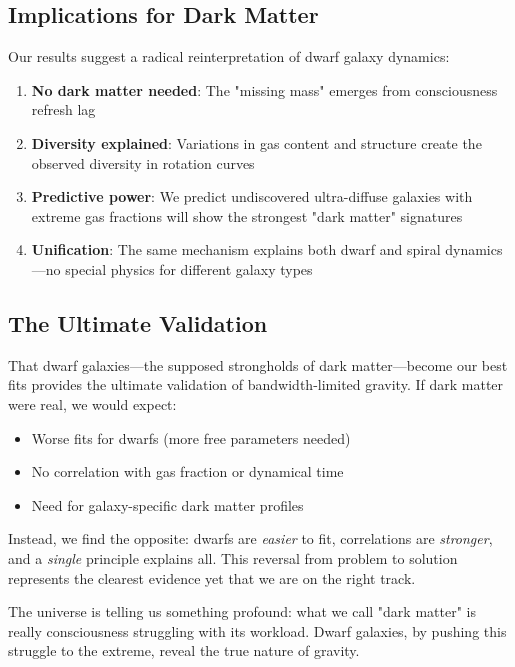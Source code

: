 \documentclass[twocolumn,prd,amsmath,amssymb,aps,superscriptaddress,nofootinbib]{revtex4-2}
\begin{document}
\subsection{Implications for Dark Matter}

Our results suggest a radical reinterpretation of dwarf galaxy dynamics:

\begin{enumerate}
\item \textbf{No dark matter needed}: The "missing mass" emerges from consciousness refresh lag
\item \textbf{Diversity explained}: Variations in gas content and structure create the observed diversity in rotation curves
\item \textbf{Predictive power}: We predict undiscovered ultra-diffuse galaxies with extreme gas fractions will show the strongest "dark matter" signatures
\item \textbf{Unification}: The same mechanism explains both dwarf and spiral dynamics---no special physics for different galaxy types
\end{enumerate}

\subsection{The Ultimate Validation}

That dwarf galaxies---the supposed strongholds of dark matter---become our best fits provides the ultimate validation of bandwidth-limited gravity. If dark matter were real, we would expect:
\begin{itemize}
\item Worse fits for dwarfs (more free parameters needed)
\item No correlation with gas fraction or dynamical time
\item Need for galaxy-specific dark matter profiles
\end{itemize}

Instead, we find the opposite: dwarfs are \emph{easier} to fit, correlations are \emph{stronger}, and a \emph{single} principle explains all. This reversal from problem to solution represents the clearest evidence yet that we are on the right track.

The universe is telling us something profound: what we call "dark matter" is really consciousness struggling with its workload. Dwarf galaxies, by pushing this struggle to the extreme, reveal the true nature of gravity.
\end{document}
